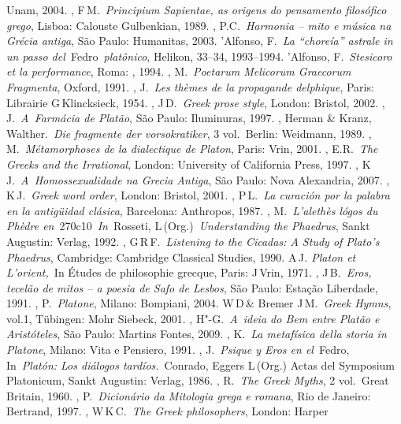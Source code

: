 \begin{bibliohedra}
  Unam, 2004.
, F\,M.~\emph{Principium Sapientae, as origens do pensamento
  filosófico grego}, Lisboa: Calouste Gulbenkian, 1989.
, P.C.~\emph{Harmonia -- mito e música na Grécia antiga}, São
  Paulo: Humanitas, 2003.
'Alfonso, F.~\emph{La ``choreía'' astrale in un passo
  del~}Fedro\emph{~platônico}, Helikon, 33--34, 1993--1994.
'Alfonso, F.~\emph{Stesicoro et la performance}, Roma: , 1994.
, M.~\emph{Poetarum Melicorum Graecorum Fragmenta}, Oxford,
  1991.
, J.~\emph{Les thèmes de la propagande delphique}, Paris:
  Librairie G\,Klincksieck, 1954.
, J\,D.~\emph{Greek prose style}, London: Bristol, 2002.
, J.~\emph{A~Farmácia de Platão}, São Paulo: Iluminuras, 1997.
, Herman \& Kranz, Walther.~\emph{Die fragmente der
  vorsokratiker}, 3 vol.~Berlin: Weidmann, 1989.
, M.~\emph{Métamorphoses de la dialectique de Platon}, Paris:
  Vrin, 2001.
, E.R.~\emph{The Greeks and the Irrational}, London: University
  of California Press, 1997.
, K\,J.~\emph{A~Homossexualidade na Grecia Antiga}, São Paulo:
  Nova Alexandria, 2007.
, K\,J.~\emph{Greek word order}, London: Bristol, 2001.
, P\,L.~\emph{La curación por la palabra en la antigüidad
  clásica}, Barcelona: Anthropos, 1987.
, M.~\emph{L'alethès lógos du Phèdre
  en}~270c10~\emph{In}~Rosseti, L\,(Org.)~\emph{Understanding the
  Phaedrus}, Sankt Augustin: Verlag, 1992.
, G\,R\,F.~\emph{Listening to the Cicadas: A Study of Plato's
  Phaedrus}, Cambridge: Cambridge Classical Studies, 1990.
 A\,J\emph{. Platon et L'orient,~}In Études de philosophie
  grecque, Paris: J\,Vrin, 1971.
, J\,B.~\emph{Eros, tecelão de mitos -- a poesia de Safo de
  Lesbos}, São Paulo: Estação Liberdade, 1991.
, P.~\emph{Platone}, Milano: Bompiani, 2004.
 W\,D\,\& Bremer J\,M.~\emph{Greek Hymns}, vol.1, Tübingen: Mohr
  Siebeck, 2001.
, H"-G.~\emph{A~ideia do Bem entre Platão e Aristóteles}, São
  Paulo: Martins Fontes, 2009.
, K.~\emph{La metafísica della storia in Platone}, Milano: Vita
  e Pensiero, 1991.
, J.~\emph{Psique y Eros en el~}Fedro, In~\emph{Platón: Los
  diálogos tardíos.}~Conrado, Eggers L\,(Org.) Actas del Symposium
  Platonicum, Sankt Augustin: Verlag, 1986.
, R.~\emph{The Greek Myths}, 2 vol.~Great Britain, 1960.
, P.~\emph{Dicionário da Mitologia grega e romana}, Rio de
  Janeiro: Bertrand, 1997.
, W\,K\,C.~\emph{The Greek philosophers}, London: Harper

\end{bibliohedra}
